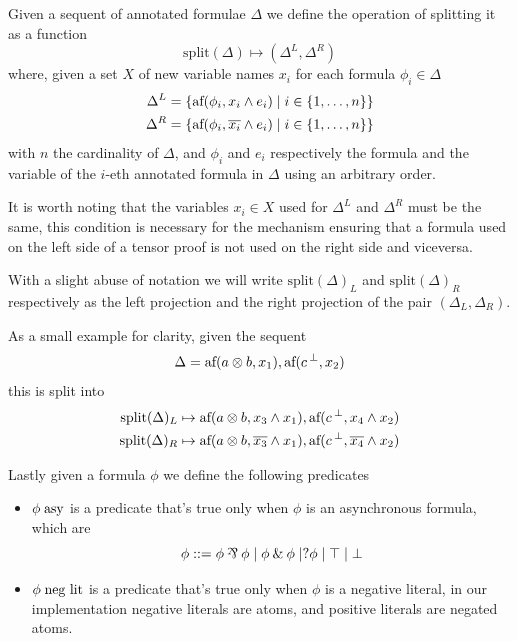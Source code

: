 \documentclass[a4paper, 12pt, tesi, english]{report}
\begin{document}
\begin{define}
	\label{def:split}
	Given a sequent of annotated formulae $\Delta$ we define the operation of splitting it as a function
	$$ \text{split}(\Delta) \mapsto (\Delta^L, \Delta^R) $$
	where, given a set $X$ of new variable names $x_i$ for each formula $\phi_i \in \Delta$
	\begin{align*}
		\Delta^L &= \{ \text{af}(\phi_i, x_i \wedge e_i) \mid i \in \{1, \dots, n\}\} \\
		\Delta^R &= \{ \text{af}(\phi_i, \overline{x_i} \wedge e_i) \mid i \in \{1, \dots, n\}\} \\
	\end{align*}
	with $n$ the cardinality of $\Delta$, and $\phi_i$ and $e_i$ respectively the formula and the variable of the $i$-eth annotated formula in $\Delta$ using an arbitrary order.

	It is worth noting that the variables $x_i \in X$ used for $\Delta^L$ and $\Delta^R$ must be the same, this condition is necessary for the mechanism ensuring that a formula used on the left side of a tensor proof is not used on the right side and viceversa.

	With a slight abuse of notation we will write $\text{split}(\Delta)_L$ and $\text{split}(\Delta)_R$ respectively as the left projection and the right projection of the pair $(\Delta_L, \Delta_R)$.
\end{define}
As a small example for clarity, given the sequent
$$ \Delta = \text{af}(a \otimes b, x_1), \text{af}({c}\,^{\bot}, x_2) $$
this is split into
\begin{align*}
	\text{split}(\Delta)_L &\mapsto \text{af}(a \otimes b, x_3 \wedge x_1), \text{af}({c}\,^{\bot}, x_4 \wedge x_2) \\
	\text{split}(\Delta)_R &\mapsto \text{af}(a \otimes b, \overline{x_3} \wedge x_1), \text{af}({c}\,^{\bot}, \overline{x_4} \wedge x_2) 
\end{align*}

\begin{define}
	Lastly given a formula $\phi$ we define the following predicates
	\begin{itemize}
		\item $\phi \; \text{asy}$ is a predicate that's true only when $\phi$ is an asynchronous formula, which are
			$$ \phi ::= \phi \llpar \phi \mid \phi \llwith \phi \mid \llwn{\phi} \mid  \lltop \mid \llbot $$
		\item $\phi \; \text{neg lit}$ is a predicate that's true only when $\phi$ is a negative literal, in our implementation negative literals are atoms, and positive literals are negated atoms.
	\end{itemize}
\end{define}
\end{document}
